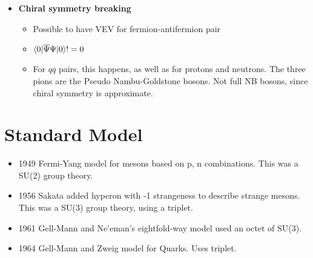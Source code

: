 \begin{itemize}
    \item \textbf{Chiral symmetry breaking} \cite{wells}
    \begin{itemize}
        \item Possible to have VEV for fermion-antifermion pair \cite{wells}
        \item $\braket{0|\overline{\Psi}\Psi|0}!=0$ \cite{wells}
        \item For $q\overline{q}$ pairs, this happens, as well as for protons and neutrons. The three pions are the Pseudo Nambu-Goldstone bosons. Not full NB bosons, since chiral symmetry is approximate. \cite{wells}
    \end{itemize}
\end{itemize}


\section{Standard Model}
\begin{itemize}
    \item 1949 Fermi-Yang model for mesons based on p, n combinations. This was a SU(2) group theory. \cite{hokim}
    \item 1956 Sakata added hyperon with -1 strangeness to describe strange mesons. This was a SU(3) group theory, using a triplet. \cite{hokim}
    \item 1961 Gell-Mann and Ne'eman's eightfold-way model used an octet of SU(3). \cite{hokim}
    \item 1964 Gell-Mann and Zweig model for Quarks. Uses triplet. \cite{hokim}
\end{itemize}

